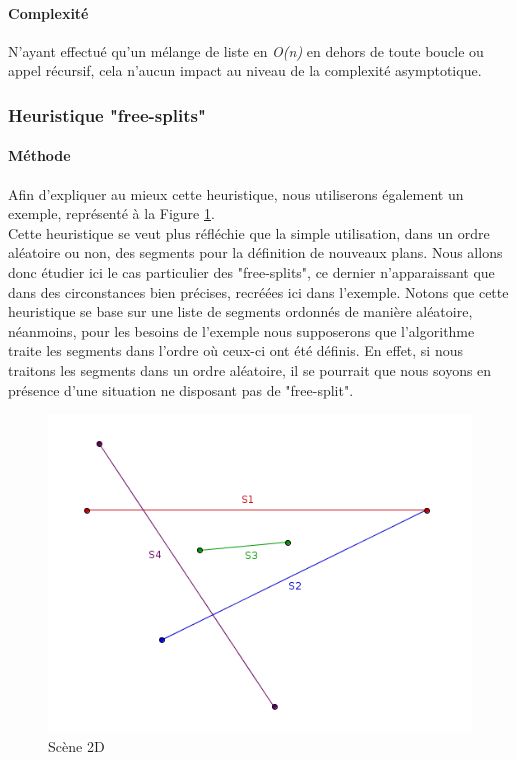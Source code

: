 \documentclass[11pt,a4paper]{article}
\begin{document}
\paragraph{Complexité}

N'ayant effectué qu'un mélange de liste en \emph{O(n)} en dehors de toute boucle ou appel récursif, cela n'aucun impact au niveau de la complexité asymptotique. 

\subsubsection{Heuristique "free-splits"}

\paragraph{Méthode}

Afin d'expliquer au mieux cette heuristique, nous utiliserons également un exemple, représenté à la Figure \ref{scene_splits}. \\

Cette heuristique se veut plus réfléchie que la simple utilisation, dans un ordre aléatoire ou non, des segments pour la définition de nouveaux plans. Nous allons donc étudier ici le cas particulier des "free-splits", ce dernier n'apparaissant que dans des circonstances bien précises, recréées ici dans l'exemple. Notons que cette heuristique se base sur une liste de segments ordonnés de manière aléatoire, néanmoins, pour les besoins de l'exemple nous supposerons que l'algorithme traite les segments dans l'ordre où ceux-ci ont été définis. En effet, si nous traitons les segments dans un ordre aléatoire, il se pourrait que nous soyons en présence d'une situation ne disposant pas de "free-split".

\begin{figure}[!h]
\centering
\includegraphics[scale=0.5]{free_splits_2.png}
\caption{Scène 2D}
\label{scene_splits}
\end{figure}
\end{document}
